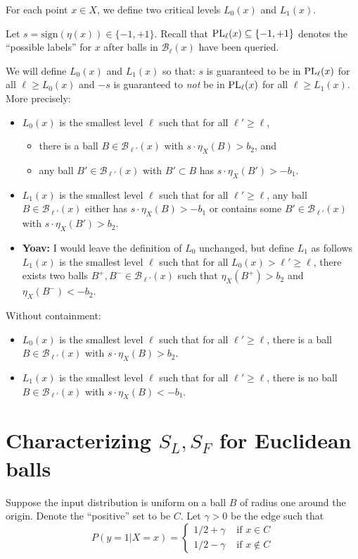 \documentclass{article}
\def\B{{\mathcal B}}
\def\PL{{\rm PL}}
\newcommand{\yoav}[1]{{\color{blue} {\bf Yoav:} #1}}
\begin{document}
For each point $x \in X$, we define two critical levels $L_0(x)$ and $L_1(x)$. 

Let $s = \mbox{sign}(\eta(x)) \in \{-1, +1\}$. Recall that $\PL_\ell(x) \subseteq \{-1,+1\}$ denotes the ``possible labels'' for $x$ after balls in $\B_\ell(x)$ have been queried.

We will define $L_0(x)$ and $L_1(x)$ so that: $s$ is guaranteed to be in $\PL_\ell(x)$ for all $\ell \geq L_0(x)$ and $-s$ is guaranteed to \emph{not} be in $\PL_\ell(x)$ for all $\ell \geq L_1(x)$. More precisely:
\begin{itemize}
\item $L_0(x)$ is the smallest level $\ell$ such that for all $\ell' \geq \ell$,
\begin{itemize}
\item there is a ball $B \in \B_{\ell'}(x)$ with $s \cdot \eta_X(B) > b_2$, and
\item any ball $B' \in \B_{\ell'}(x)$ with $B' \subset B$ has $s \cdot \eta_X(B') > -b_1$.
\end{itemize}
\item $L_1(x)$ is the smallest level $\ell$ such that for all $\ell' \geq \ell$, any ball $B \in \B_{\ell'}(x)$ either has $s \cdot \eta_X(B) > -b_1$ or contains some $B' \in \B_{\ell'}(x)$ with $s \cdot \eta_X(B') > b_2$.
\item \yoav{I would leave the definition of $L_0$ unchanged, but define $L_1$ as follows} $L_1(x)$ is the smallest level $\ell$ such that for all $L_0(x) > \ell' \geq \ell$, 
there exists two balls $B^+,B^- \in \B_{\ell'}(x)$ such that $\eta_X(B^+) > b_2$ and $\eta_X(B^-) < -b_2$.
\end{itemize}

Without containment:
\begin{itemize}
\item $L_0(x)$ is the smallest level $\ell$ such that for all $\ell' \geq \ell$, there is a ball $B \in \B_{\ell'}(x)$ with $s \cdot \eta_X(B) > b_2$.
\item $L_1(x)$ is the smallest level $\ell$ such that for all $\ell' \geq \ell$, there is no ball $B \in \B_{\ell'}(x)$ with $s \cdot \eta_X(B) < -b_1$.
\end{itemize}


\section{Characterizing $S_L,S_F$  for Euclidean balls}
Suppose the input
distribution is uniform on a ball $B$ of radius one  around the
origin. Denote the ``positive'' set to be $C$. Let $\gamma>0$ be the
edge such that
\[
  P(y=1|X=x) =\begin{cases}
    1/2+\gamma & \mbox{ if } x \in C \\
    1/2-\gamma & \mbox{ if } x \notin C
    \end{cases}
  \]
\end{document}
